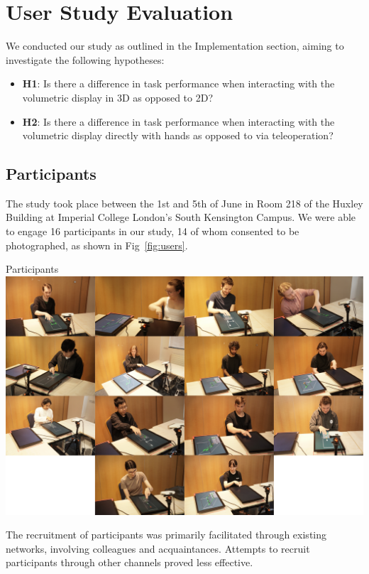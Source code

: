 \section{User Study Evaluation}

We conducted our study as outlined in the Implementation section, aiming to investigate the following hypotheses:

\begin{itemize}[itemsep=-0.3em]
    \item \textbf{H1}: Is there a difference in task performance when interacting with the volumetric display in 3D as opposed to 2D?
    \item \textbf{H2}: Is there a difference in task performance when interacting with the volumetric display directly with hands as opposed to via teleoperation?
\end{itemize}

\subsection{Participants}
The study took place between the 1st and 5th of June in Room 218 of the Huxley Building at Imperial College London's South Kensington Campus. We were able to engage 16 participants in our study, 14 of whom consented to be photographed, as shown in Fig~\ref{fig:users}.

\begin{figureBox}[label={fig:users}, width=1.0\linewidth]{Participants}
    \includegraphics[width = 1.0\linewidth]{./evaluation/figures/users.pdf}
\end{figureBox}

The recruitment of participants was primarily facilitated through existing networks, involving colleagues and acquaintances. Attempts to recruit participants through other channels proved less effective. \\

